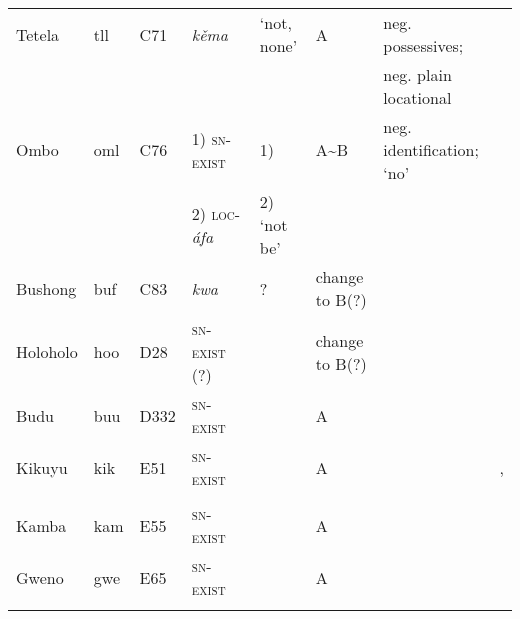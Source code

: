 \documentclass[output=paper,draft,draftmode,colorlinks,citecolor=brown]{langscibook}
\begin{document}
\begin{paperappendix}
\begin{sidewaystable}
\begin{tabularx}{\textwidth}{llllllQQ}
{Tetela} 	&{tll} 		&{C71} 	&\textit{k{\v e}ma}&`not, none' 							&A 		&neg. possessives;								&\citet{Jacobs1964}\\
				&				&				&				&										&		&neg. plain locational								&\\
{Ombo} 	&{oml} 	&{C76} 	&1) \textsc{sn-exist}&1) \textendash						&A{\textasciitilde}B&neg. identification; `no'					&\citet{Meeussen1952}\\
				&				&				&2) \textsc{loc}-\textit{áfa}&2) `not be' \\
{Bushong} &{buf}	&{C83} 	&\textit{kwa} 	&? 										&change to B(?) 	&												&\citet{Vansina1959}\\
{Holoholo}	&{hoo}	&{D28} 	&\textsc{sn-exist} (?)&\textendash							&change to B(?) 	&												&\citet{Coupez1955}\\
{Budu}	&{buu} 	&{D332} 	&\textsc{sn-exist}	&\textendash								&A{}	&												&\citet{Asangama1983}\\
{Kikuyu} 	&{kik} 	&{E51} 	&\textsc{sn-exist}	&\textendash								&A{}	&												&\citet{Englebretson2015},\\
				&				&				&				&										&		&												&\citet{Gregoire1975}\\
{Kamba} 	&{kam} 	&{E55} 	&\textsc{sn-exist}	&\textendash								&A{}	&												&\citet{WhiteleyMuli1962}\\
{Gweno} 	&{gwe} 	&{E65} 	&\textsc{sn-exist}	&\textendash								&A{}	&\textendash										&\citet{PhilippsonNurse2000}\\
\lspbottomrule
\end{tabularx}
\end{sidewaystable}


\end{paperappendix}
\end{document}
